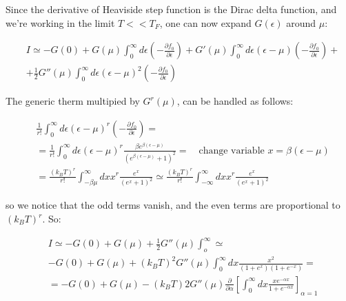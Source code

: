 \documentclass{article}
\begin{document}
Since the derivative of Heaviside step function is the Dirac delta function, and we're working in the limit $T<<T_F$,
one can now expand $G(\epsilon)$ around $\mu$:

\begin{equation}
    \begin{aligned}
         & I\simeq -G(0)+G(\mu)\int_0^\infty d\epsilon\left( -\frac{\partial f_0}{\partial \epsilon} \right) +G'(\mu)\int_0^\infty d\epsilon(\epsilon-\mu)\left( -\frac{\partial f_0}{\partial \epsilon} \right) + \\
         & + \frac{1}{2}G''(\mu)\int_0^\infty d\epsilon(\epsilon-\mu)^2\left( -\frac{\partial f_0}{\partial \epsilon} \right)
    \end{aligned}
\end{equation}

The generic therm multipied by $G^r(\mu)$, can be handled as follows:

\begin{equation}
    \begin{aligned}
         & \frac{1}{r!}\int_0^\infty d\epsilon(\epsilon-\mu)^r\left( -\frac{\partial f_0}{\partial \epsilon} \right)=                                                                      \\
         & = \frac{1}{r!}\int_0^\infty d\epsilon (\epsilon-\mu)^r\frac{\beta e^{\beta(\epsilon-\mu)}}{(e^{\beta(\epsilon-\mu)}+1)^2}= \quad \text{change variable $x=\beta(\epsilon-\mu)$} \\
         & = \frac{(k_BT)^r}{r!}\int_{-\beta\mu}^\infty dx x^r\frac{e^x}{(e^x+1)^2}\simeq \frac{(k_BT)^r}{r!}\int_{-\infty}^\infty dx x^r\frac{e^x}{(e^x+1)^2}
    \end{aligned}
\end{equation}

so we notice that the odd terms vanish, and the even terms are proportional to $(k_BT)^r$.
So:

\begin{equation}
    \begin{aligned}
         & I\simeq -G(0)+G(\mu)+\frac{1}{2}G''(\mu)\int_o^\infty \simeq                                                                                 \\
         & -G(0)+G(\mu)+(k_BT)^2G''(\mu)\int_0^\infty dx \frac{x^2}{(1+e^x)(1+e^{-x})}=                                                                 \\
         & =-G(0)+G(\mu)-(k_BT)2G''(\mu)\frac{\partial}{\partial \alpha}\left[\int_0^\infty dx \frac{xe^{-\alpha x}}{1+e^{-\alpha x}}\right]_{\alpha=1}
    \end{aligned}
\end{equation}
\end{document}
